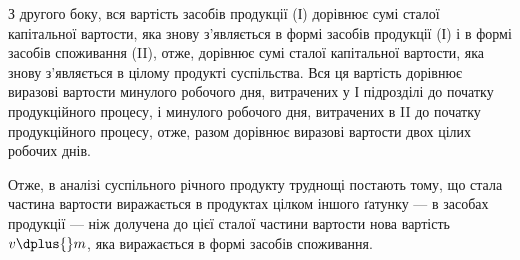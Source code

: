 З другого боку, вся вартість засобів продукції (І) дорівнює сумі сталої
капітальної вартости, яка знову з’являється в формі засобів продукції
(І) і в формі засобів споживання (II), отже, дорівнює сумі сталої
капітальної вартости, яка знову з’являється в цілому продукті суспільства.
Вся ця вартість дорівнює виразові вартости  минулого робочого дня,
витрачених у І підрозділі до початку продукційного процесу, і 
минулого робочого дня, витрачених в II до початку продукційного процесу,
отже, разом дорівнює виразові вартости двох цілих робочих днів.

Отже, в аналізі суспільного річного продукту труднощі постають тому,
що стала частина вартости виражається в продуктах цілком іншого ґатунку
— в засобах продукції — ніж долучена до цієї сталої частини
вартости нова вартість $v \dplus{} m$, яка виражається в формі засобів споживання.
\parbreak{}  %
